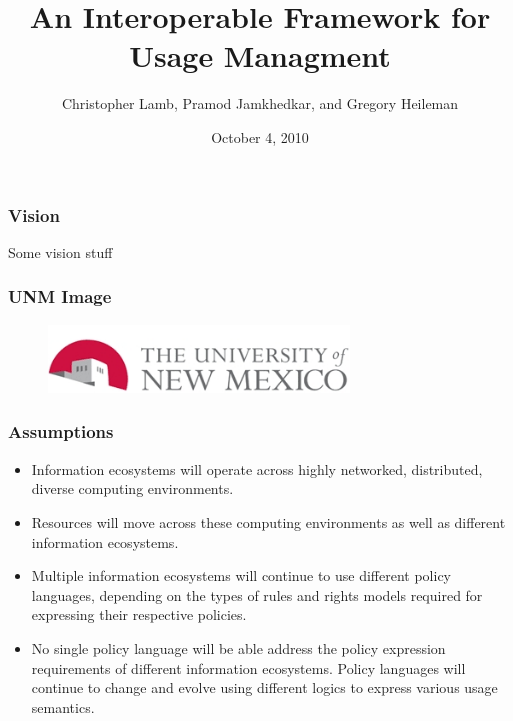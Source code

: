 \documentclass[t, 10pt]{beamer}
\title{An Interoperable Framework for Usage Managment}
\author [Chris]{Christopher Lamb, Pramod Jamkhedkar, and Gregory Heileman}
\institute[University of New Mexico]{
\inst {}Department of Electrical and Computer Engineering\\
University of New Mexico}
\date{October 4, 2010}
\begin{document}
\begin{frame}
\titlepage
\end{frame}


\begin{frame}
\frametitle{Vision}
Some vision stuff
\end{frame}

\begin{frame}
\frametitle{UNM Image}

\begin{figure} 
\includegraphics[width = 8cm]{UNM}
\end{figure}
 
\end{frame}

\begin{frame}
\frametitle{Assumptions}

\begin{itemize}
	\item Information ecosystems will operate across highly networked,
distributed, diverse computing environments.
\pause
	\item Resources will move across these computing environments
as well as different information ecosystems.
\pause
	\item Multiple information ecosystems will continue to use different
policy languages, depending on the types of rules and
rights models required for expressing their respective policies.
\pause
	\item No single policy language will be able address the policy expression
requirements of different information ecosystems.
Policy languages will continue to change and evolve using
different logics to express various usage semantics.
\end{itemize}

\end{frame}

%
%
\end{document}
